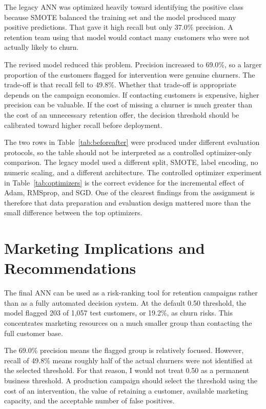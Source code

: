 \documentclass[11pt]{article}
\begin{document}
The legacy ANN was optimized heavily toward identifying the positive class because SMOTE balanced the training set and the model produced many positive predictions. That gave it high recall but only 37.0\% precision. A retention team using that model would contact many customers who were not actually likely to churn.

The revised model reduced this problem. Precision increased to 69.0\%, so a larger proportion of the customers flagged for intervention were genuine churners. The trade-off is that recall fell to 49.8\%. Whether that trade-off is appropriate depends on the campaign economics. If contacting customers is expensive, higher precision can be valuable. If the cost of missing a churner is much greater than the cost of an unnecessary retention offer, the decision threshold should be calibrated toward higher recall before deployment.

The two rows in Table~\ref{tab:beforeafter} were produced under different evaluation protocols, so the table should not be interpreted as a controlled optimizer-only comparison. The legacy model used a different split, SMOTE, label encoding, no numeric scaling, and a different architecture. The controlled optimizer experiment in Table~\ref{tab:optimizers} is the correct evidence for the incremental effect of Adam, RMSprop, and SGD. One of the clearest findings from the assignment is therefore that data preparation and evaluation design mattered more than the small difference between the top optimizers.

\section{Marketing Implications and Recommendations}

The final ANN can be used as a risk-ranking tool for retention campaigns rather than as a fully automated decision system. At the default 0.50 threshold, the model flagged 203 of 1,057 test customers, or 19.2\%, as churn risks. This concentrates marketing resources on a much smaller group than contacting the full customer base.

The 69.0\% precision means the flagged group is relatively focused. However, recall of 49.8\% means roughly half of the actual churners were not identified at the selected threshold. For that reason, I would not treat 0.50 as a permanent business threshold. A production campaign should select the threshold using the cost of an intervention, the value of retaining a customer, available marketing capacity, and the acceptable number of false positives.
\end{document}

